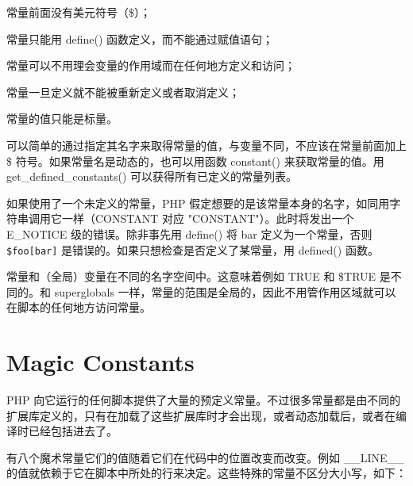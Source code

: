 \begin{compactitem}
\item 常量前面没有美元符号（\$）；
\item 常量只能用 define() 函数定义，而不能通过赋值语句；
\item 常量可以不用理会变量的作用域而在任何地方定义和访问；
\item 常量一旦定义就不能被重新定义或者取消定义；
\item 常量的值只能是标量。
\end{compactitem}


可以简单的通过指定其名字来取得常量的值，与变量不同，不应该在常量前面加上 \$ 符号。如果常量名是动态的，也可以用函数 constant() 来获取常量的值。用 get\_defined\_constants() 可以获得所有已定义的常量列表。

如果使用了一个未定义的常量，PHP 假定想要的是该常量本身的名字，如同用字符串调用它一样（CONSTANT 对应 "CONSTANT"）。此时将发出一个 E\_NOTICE 级的错误。除非事先用 define() 将 bar 定义为一个常量，否则\texttt{\$foo[bar]} 是错误的。如果只想检查是否定义了某常量，用 defined() 函数。



常量和（全局）变量在不同的名字空间中。这意味着例如 TRUE 和 \$TRUE 是不同的。和 superglobals 一样，常量的范围是全局的，因此不用管作用区域就可以在脚本的任何地方访问常量。














\section{Magic Constants}


PHP 向它运行的任何脚本提供了大量的预定义常量。不过很多常量都是由不同的扩展库定义的，只有在加载了这些扩展库时才会出现，或者动态加载后，或者在编译时已经包括进去了。

有八个魔术常量它们的值随着它们在代码中的位置改变而改变。例如 \_\_LINE\_\_ 的值就依赖于它在脚本中所处的行来决定。这些特殊的常量不区分大小写，如下：

